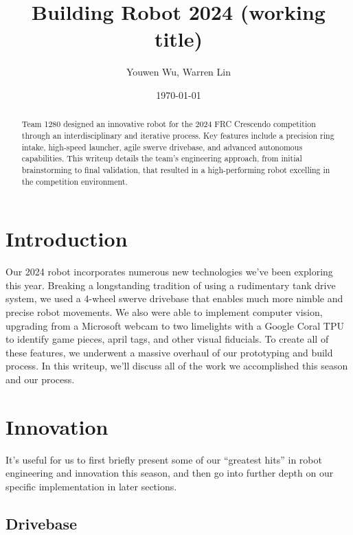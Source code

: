 




\title{Building Robot 2024 (working title)}
\author{Youwen Wu, Warren Lin}
\date{\today}
\maketitle

\begin{abstract}
  Team 1280 designed an innovative robot for the 2024 FRC Crescendo
  competition through an interdisciplinary and iterative process. Key
  features include a precision ring intake, high-speed launcher, agile
  swerve drivebase, and advanced autonomous capabilities. This writeup
  details the team's engineering approach, from initial brainstorming to
  final validation, that resulted in a high-performing robot excelling
  in the competition environment.
\end{abstract}


\section{Introduction}

Our 2024 robot incorporates numerous new technologies we've been
exploring this year. Breaking a longstanding tradition of using a
rudimentary tank drive system, we used a 4-wheel swerve drivebase that
enables much more nimble and precise robot movements. We also were able
to implement computer vision, upgrading from a Microsoft webcam to two
limelights with a Google Coral TPU to identify game pieces, april tags,
and other visual fiducials. To create all of these features, we
underwent a massive overhaul of our prototyping and build process. In
this writeup, we'll discuss all of the work we accomplished this season
and our process.

\section{Innovation}
It's useful for us to first briefly present some of our ``greatest
hits'' in robot engineering and innovation this season, and then go into
further depth on our specific implementation in later sections.

\subsection{Drivebase}

